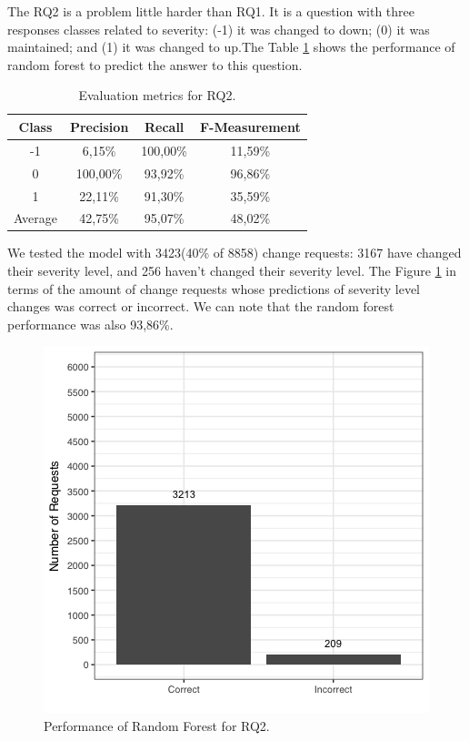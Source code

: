 \documentclass[10pt, conference]{IEEEtran}
\begin{document}
The RQ2 is a problem little harder than RQ1. It is a question with three responses classes related to severity: (-1) it was changed to down; (0)  it was maintained; and (1) it was changed to up.The Table \ref{tab:metrics_for_rq2} shows the performance of random forest to predict the answer to this question. 

\begin{table}[!ht]
	\renewcommand{\arraystretch}{1.3}
	\caption{Evaluation metrics for RQ2.}
	\label{tab:metrics_for_rq2}
	\centering
	\begin{tabular}{|c|c|c|c|}
		\hline
		Class & Precision & Recall & F-Measurement\\
		\hline
		-1 & 6,15\% & 100,00\% & 11,59\%\\
		\hline
		0 & 100,00\% & 93,92\% & 96,86\%\\
		\hline
		1 & 22,11\% & 91,30\% & 35,59\%\\
		\hline\hline 
		Average & 42,75\% & 95,07\% & 48,02\% \\
		\hline 
	\end{tabular}
\end{table}

We tested the model with 3423(40\% of 8858) change requests: 3167 have changed their severity level, and 256 haven't changed their severity level. The Figure \ref{fig:rf_performance_for_q2} in terms of the amount of change requests whose predictions of severity level changes was correct or incorrect. We can note that the random forest performance was also 93,86\%.

\begin{figure}[!hbt]
   \label{fig:rf_performance_for_q2}
  \includegraphics[scale=0.60]{figures/rf_performance_for_q2.png}
  \caption{Performance of Random Forest for RQ2.}
\end{figure}
\end{document}
